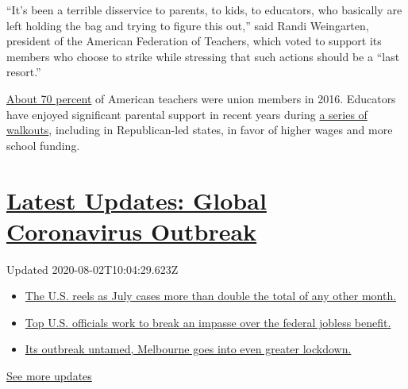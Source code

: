 ``It's been a terrible disservice to parents, to kids, to educators, who
basically are left holding the bag and trying to figure this out,'' said
Randi Weingarten, president of the American Federation of Teachers,
which voted to support its members who choose to strike while stressing
that such actions should be a ``last resort.''

\href{https://nces.ed.gov/surveys/ntps/tables/Table_TeachersUnion.asp}{About
70 percent} of American teachers were union members in 2016. Educators
have enjoyed significant parental support in recent years during
\href{https://www.nytimes.com/2019/01/14/us/lausd-teachers-strike.html}{a
series of walkouts}, including in Republican-led states, in favor of
higher wages and more school funding.

\hypertarget{latest-updates-global-coronavirus-outbreak}{%
\section{\texorpdfstring{\href{https://www.nytimes.com/2020/08/01/world/coronavirus-covid-19.html?action=click\&pgtype=Article\&state=default\&region=MAIN_CONTENT_1\&context=storylines_live_updates}{Latest
Updates: Global Coronavirus
Outbreak}}{Latest Updates: Global Coronavirus Outbreak}}\label{latest-updates-global-coronavirus-outbreak}}

Updated 2020-08-02T10:04:29.623Z

\begin{itemize}
\tightlist
\item
  \href{https://www.nytimes.com/2020/08/01/world/coronavirus-covid-19.html?action=click\&pgtype=Article\&state=default\&region=MAIN_CONTENT_1\&context=storylines_live_updates\#link-34047410}{The
  U.S. reels as July cases more than double the total of any other
  month.}
\item
  \href{https://www.nytimes.com/2020/08/01/world/coronavirus-covid-19.html?action=click\&pgtype=Article\&state=default\&region=MAIN_CONTENT_1\&context=storylines_live_updates\#link-780ec966}{Top
  U.S. officials work to break an impasse over the federal jobless
  benefit.}
\item
  \href{https://www.nytimes.com/2020/08/01/world/coronavirus-covid-19.html?action=click\&pgtype=Article\&state=default\&region=MAIN_CONTENT_1\&context=storylines_live_updates\#link-2bc8948}{Its
  outbreak untamed, Melbourne goes into even greater lockdown.}
\end{itemize}

\href{https://www.nytimes.com/2020/08/01/world/coronavirus-covid-19.html?action=click\&pgtype=Article\&state=default\&region=MAIN_CONTENT_1\&context=storylines_live_updates}{See
more updates}

